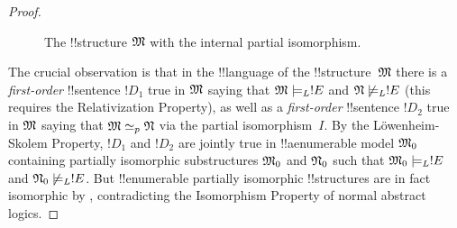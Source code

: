 \documentclass[../../../include/open-logic-section]{subfiles}
\begin{document}
\begin{proof}
\begin{figure}[h]
  \centering
  \caption{The !!{structure} $\mathfrak M$ with the internal
    partial isomorphism.}
\end{figure}

The crucial observation is that in the !!{language} of the
!!{structure}~$\mathfrak M$ there is a \emph{first-order} !!{sentence} $!D_1$
true in $\mathfrak M$ saying that $\mathfrak M \models_L !E$ and
$\mathfrak N \not\models_L !E$ (this requires the Relativization
Property), as well as a \emph{first-order} !!{sentence} $!D_2$ true in
$\mathfrak M$ saying that $\mathfrak M \simeq_p \mathfrak N$ via the
partial isomorphism~$I$. By the L\"owenheim-Skolem Property, $!D_1$
and $!D_2$ are jointly true in !!a{enumerable} model $\mathfrak M_0$
containing partially isomorphic substructures $\mathfrak M_0$ and
$\mathfrak N_0$ such that $\mathfrak M_0 \models_L !E$ and $\mathfrak N_0
\not\models_L !E$. But !!{enumerable} partially isomorphic !!{structure}s are
in fact isomorphic by , contradicting the
Isomorphism Property of normal abstract logics.
\end{proof}
\end{document}
